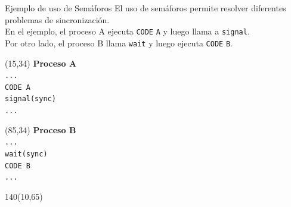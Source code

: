 \documentclass[aspectratio=169]{beamer}
\begin{document}
\begin{frame}[fragile,t]{Ejemplo de uso de Semáforos}
    El uso de semáforos permite resolver diferentes problemas de sincronización.\\
    \medskip
    En el ejemplo, el proceso A ejecuta \texttt{CODE} \texttt{A} y luego llama a \texttt{signal}.\\
    \medskip
    Por otro lado, el proceso B llama \texttt{wait} y luego ejecuta \texttt{CODE} \texttt{B}.\\
    \begin{textblock}{70}(15,34)
    \textbf{Proceso A}\\
    \medskip
    \verb|...|\\
    \verb|CODE A|\\
    \verb|signal(sync)|\\
    \verb|...|\\
    \end{textblock}
    \begin{textblock}{70}(85,34)
    \textbf{Proceso B}\\
    \medskip
    \verb|...|\\
    \verb|wait(sync)|\\
    \verb|CODE B|\\
    \verb|...|\\
    \end{textblock}
    \begin{textblock}{140}(10,65)
    \end{textblock}
\end{frame}
\end{document}
